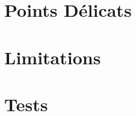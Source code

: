 \documentclass[12pt]{article}
\begin{document}
\section {Points Délicats}


\section {Limitations}


\section {Tests}
\end{document}
